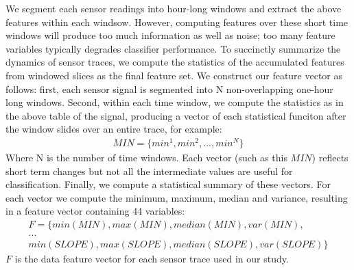 We segment each sensor readings into hour-long windows and extract the above features within each windsow. 
However, computing features over these short time windows will produce too much information as well as noise; too many feature variables typically degrades classifier performance.
To succinctly summarize the dynamics of sensor traces, we compute the statistics of the accumulated features from windowed slices as the final feature set. 
We construct our feature vector as follows: first, each sensor signal is segmented into N non-overlapping one-hour long windows. Second, within each time window, we compute the statistics as in the above table of the signal, producing a vector of each statistical funciton after the window slides over an entire trace, for example: 
\begin{displaymath}
\begin{split}
MIN = \{min^{1}, min^{2}, ..., min^{N}\}
\end{split}
\end{displaymath}
Where N is the number of time windows. Each vector (such as this $MIN$) reflects short term changes but not all the intermediate values are useful for classification. 
Finally, we compute a statistical summary of these vectors. For each vector we compute the minimum, maximum, median and variance, resulting in a feature vector containing 44 variables:
\begin{displaymath}
\begin{split}
F = \{min(MIN), max(MIN), median(MIN), var(MIN),\\
...\\
min(SLOPE), max(SLOPE), median(SLOPE), var(SLOPE)\}
\end{split}
\end{displaymath}
$F$ is the data feature vector for each sensor trace used in our study.


